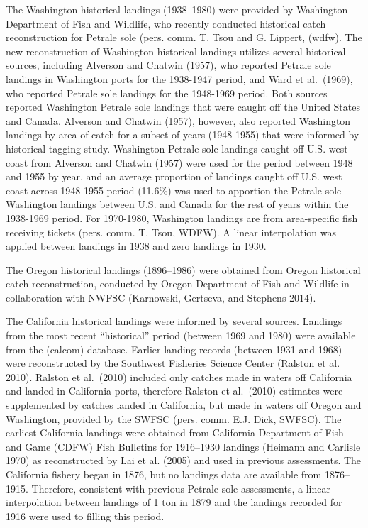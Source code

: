 \documentclass[
]{scrartcl}
\begin{document}
The Washington historical landings (1938--1980) were provided by
Washington Department of Fish and Wildlife, who recently conducted
historical catch reconstruction for Petrale sole (pers. comm. T. Tsou
and G. Lippert, (wdfw). The new reconstruction of Washington historical
landings utilizes several historical sources, including Alverson and
Chatwin (1957), who reported Petrale sole landings in Washington ports
for the 1938-1947 period, and Ward et al.~(1969), who reported Petrale
sole landings for the 1948-1969 period. Both sources reported Washington
Petrale sole landings that were caught off the United States and Canada.
Alverson and Chatwin (1957), however, also reported Washington landings
by area of catch for a subset of years (1948-1955) that were informed by
historical tagging study. Washington Petrale sole landings caught off
U.S. west coast from Alverson and Chatwin (1957) were used for the
period between 1948 and 1955 by year, and an average proportion of
landings caught off U.S. west coast across 1948-1955 period (11.6\%) was
used to apportion the Petrale sole Washington landings between U.S. and
Canada for the rest of years within the 1938-1969 period. For 1970-1980,
Washington landings are from area-specific fish receiving tickets (pers.
comm. T. Tsou, WDFW). A linear interpolation was applied between
landings in 1938 and zero landings in 1930.

The Oregon historical landings (1896--1986) were obtained from Oregon
historical catch reconstruction, conducted by Oregon Department of Fish
and Wildlife in collaboration with NWFSC (Karnowski, Gertseva, and
Stephens 2014).

The California historical landings were informed by several sources.
Landings from the most recent ``historical'' period (between 1969 and
1980) were available from the (calcom) database. Earlier landing records
(between 1931 and 1968) were reconstructed by the Southwest Fisheries
Science Center (Ralston et al. 2010). Ralston et al.~(2010) included
only catches made in waters off California and landed in California
ports, therefore Ralston et al.~(2010) estimates were supplemented by
catches landed in California, but made in waters off Oregon and
Washington, provided by the SWFSC (pers. comm. E.J. Dick, SWFSC). The
earliest California landings were obtained from California Department of
Fish and Game (CDFW) Fish Bulletins for 1916--1930 landings (Heimann and
Carlisle 1970) as reconstructed by Lai et al. (2005) and used in
previous assessments. The California fishery began in 1876, but no
landings data are available from 1876--1915. Therefore, consistent with
previous Petrale sole assessments, a linear interpolation between
landings of 1 ton in 1879 and the landings recorded for 1916 were used
to filling this period.
\end{document}
